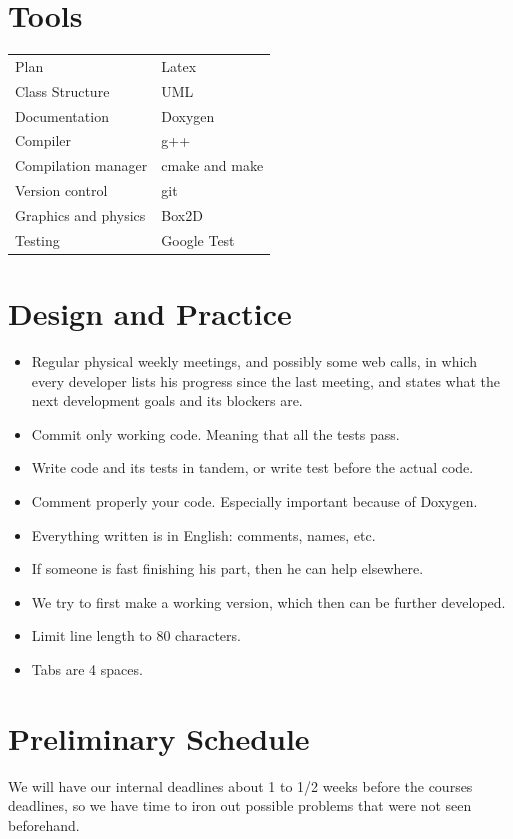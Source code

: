\documentclass{article}
\begin{document}
\section{Tools}
\begin{tabular}{ll}
Plan                    & Latex \\
Class Structure         & UML \\
Documentation           & Doxygen \\
Compiler                & g++ \\
Compilation manager     & cmake and make \\
Version control         & git \\
Graphics and physics    & Box2D \\
Testing                 & Google Test \\
\end{tabular}



\section{Design and Practice}
\begin{itemize}
\item Regular physical weekly meetings, and possibly some web calls,
in which every developer lists his progress since the last meeting,
and states what the next development goals and its blockers are.
\item Commit only working code. Meaning that all the tests pass.
\item Write code and its tests in tandem, or write test before the actual code.
\item Comment properly your code. Especially important because of Doxygen.
\item Everything written is in English: comments, names, etc.
\item If someone is fast finishing his part, then he can help elsewhere.
\item We try to first make a working version, which then can be further
developed.
\item Limit line length to 80 characters.
\item Tabs are 4 spaces.
\end{itemize}



\section{Preliminary Schedule}
We will have our internal deadlines about 1 to 1/2 weeks before the
courses deadlines, so we have time to iron out possible problems that
were not seen beforehand.
\end{document}

